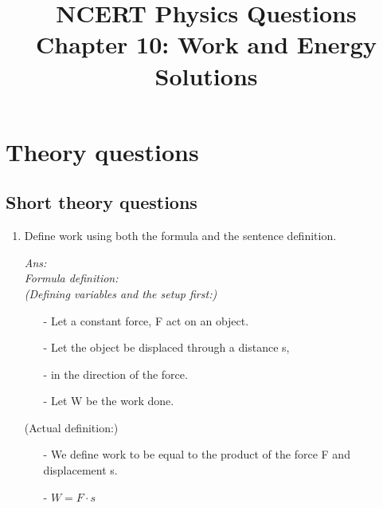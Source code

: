 \documentclass[12pt]{article}
\title{NCERT Physics Questions \\ Chapter 10: Work and Energy \\ Solutions}
\author{}
\date{}
\begin{document}
\maketitle

\section*{Theory questions}
\subsection*{Short theory questions}
\begin{enumerate}
	\item Define work using both the formula and the sentence definition. \\
		{\itshape
			Ans: \\
			Formula definition: \\
			(Defining variables and the setup first:)
			\begin{itemize}
				\item[-] Let a constant force, F act on an object.
				\item[-] Let the object be displaced through a distance s, 
				\item[-] in the direction of the force.
				\item[-] Let W be the work done. 
			\end{itemize}	
			(Actual definition:)
			\begin{itemize}
				\item[-] We define work to be equal to the product of the force F and displacement s.
				\item[-] $W = F \cdot s$
			\end{itemize}	

}
\end{enumerate}
\end{document}

